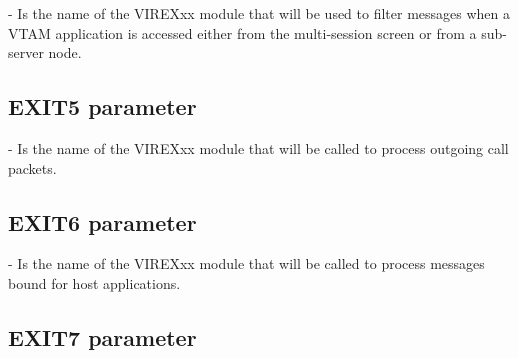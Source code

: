\documentclass[letterpaper,10pt,english]{sphinxmanual}
\begin{document}
 - Is the name of the VIREXxx module that will be used to filter messages when a VTAM application is accessed either from the multi-session screen or from a sub-server node.


\subsection{EXIT5 parameter}
\label{\detokenize{Installation_Guide:index-58}}\label{\detokenize{Installation_Guide:exit5-parameter}}
\begin{sphinxVerbatim}[commandchars=\\\{\}]
 
\end{sphinxVerbatim}

 - Is the name of the VIREXxx module that will be called to process outgoing call packets.


\subsection{EXIT6 parameter}
\label{\detokenize{Installation_Guide:index-59}}\label{\detokenize{Installation_Guide:exit6-parameter}}
\begin{sphinxVerbatim}[commandchars=\\\{\}]
 
\end{sphinxVerbatim}

 - Is the name of the VIREXxx module that will be called to process messages bound for host applications.


\subsection{EXIT7 parameter}
\label{\detokenize{Installation_Guide:exit7-parameter}}\label{\detokenize{Installation_Guide:index-60}}
\begin{sphinxVerbatim}[commandchars=\\\{\}]
 
\end{sphinxVerbatim}
\end{document}
